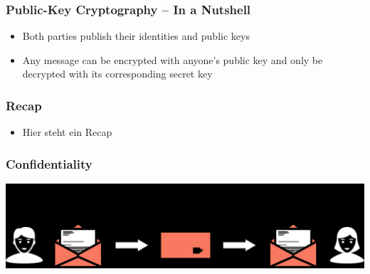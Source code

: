 \documentclass[
	aspectratio=169,
	xetex,
]{beamer}
\begin{document}
\begin{frame}
	\frametitle{Public-Key Cryptography -- In a Nutshell}
	\vspace{3mm}
	\begin{minipage}[t][.65\textheight]{\textwidth}
		\begin{center}
		\end{center}
	\end{minipage}

	\begin{itemize}
		\item Both parties publish their identities and public keys
		\item Any message can be encrypted with anyone's public key and only be decrypted with its corresponding secret key
	\end{itemize}

\end{frame}

\begin{frame}
	\frametitle{Recap}
	\begin{itemize}
		\item Hier steht ein Recap
	\end{itemize}
\end{frame}

\begin{frame}
	\frametitle{Confidentiality}
	\centering
	\includegraphics[width=.8\textwidth]{img/confidentiality.pdf}
\end{frame}
\end{document}
